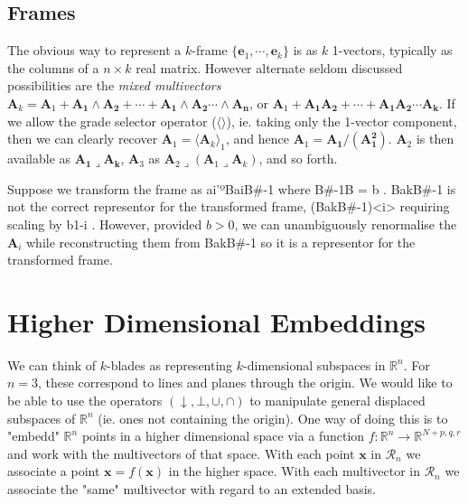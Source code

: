 \documentclass[a4paper]{book}
\numberwithin{equation}{chapter}
\begin{document}
\subsection{Frames}

The obvious way to represent a $k$-frame $\{\mathbf{e}_1, \cdots ,\mathbf{e}_k\}$ 
is as $k$ 1-vectors, typically as the columns of a $n\times k$ real matrix. 
However alternate seldom discussed possibilities are the \emph{mixed multivectors} 
$\mathbf{A}_k = \mathbf{A}_1 + \mathbf{A_1 \wedge A_2} + \cdots + \mathbf{A_1\wedge A_2 \cdots \wedge A_n}$, or $\mathbf{A}_1 + \mathbf{A_1 A_2} + \cdots + \mathbf{A_1A_2\cdots A_k}$.
If we allow the grade selector operator ($\langle \rangle$), ie. taking only the 1-vector component, then
we can clearly recover $\mathbf{A}_1 = \langle \mathbf{A}_k \rangle_1$, and hence 
$\mathbf{A}_1=\mathbf{A_1}/(\mathbf{A_1^2})$. $\mathbf{A}_2$ 
is then available as $\mathbf{A_1 \lrcorner A_k}$, 
$\mathbf{A}_3$ as $\mathbf{A}_2\lrcorner(\mathbf{A}_1\lrcorner\mathbf{A}_k)$, and so forth.

\vspace{\baselineskip}

Suppose we transform the frame as ai'ºBaiB#-1 where B#-1B = b .
BakB#-1 is not the correct representor for the transformed frame, (BakB#-1)<i> requiring scaling by b1-i . However, provided $b>0$, we can unambiguously renormalise the $\mathbf{A}_i$ while reconstructing them from BakB#-1 so it is a representor for the transformed frame.


    
    \section{Higher Dimensional Embeddings}

We can think of $k$-blades as representing $k$-dimensional subspaces in $\mathbb{R}^n$.
For $n=3$, these correspond to lines and planes through the origin. We would like to be able to 
use the operators $(\downarrow,\bot,\cup,\cap)$ to manipulate general displaced subspaces of 
$\mathbb{R}^n$ (ie. ones not containing the origin). 
One way of doing this is to "embedd" $\mathbb{R}^n$ points in a 
higher dimensional space via a function $f : \mathbb{R}^n \rightarrow \mathbb{R}^{N+p,q,r}$
and work with the multivectors of that space. With each point $\mathbf{x}$ in
$\mathcal{R}_n$ we associate a point $\mathbf{x} = f(\mathbf{x})$ 
in the higher space. With each multivector in $\mathcal{R}_n$ we 
associate the "same" multivector with regard to an extended basis.
\end{document}
